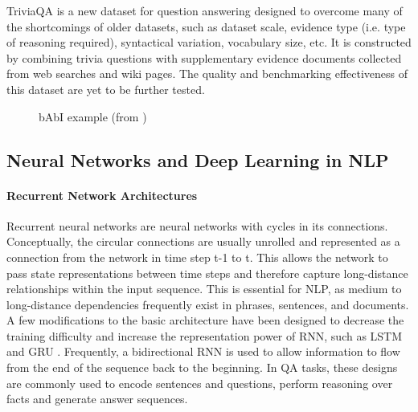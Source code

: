 \documentclass[]{article}
\begin{document}
TriviaQA \cite{joshi2017triviaqa} is a new dataset for question answering designed to overcome many of the shortcomings of older datasets, such as dataset scale, evidence type (i.e. type of reasoning required), syntactical variation, vocabulary size, etc. It is constructed by combining trivia questions with supplementary evidence documents collected from web searches and wiki pages. The quality and benchmarking effectiveness of this dataset are yet to be further tested. 

\begin{center}
\begin{figure}
\caption{bAbI example (from \cite{hermann2015teaching})}
\label{fig:babi}
\end{figure}
\end{center}

\subsection{Neural Networks and Deep Learning in NLP}

\paragraph{Recurrent Network Architectures}
Recurrent neural networks are neural networks with cycles in its connections. Conceptually, the circular connections are usually unrolled and represented as a connection from the network in time step t-1 to t. This allows the network to pass state representations between time steps and therefore capture long-distance relationships within the input sequence. This is essential for NLP, as medium to long-distance dependencies frequently exist in phrases, sentences, and documents. A few modifications to the basic architecture have been designed to decrease the training difficulty and increase the representation power of RNN, such as LSTM \cite{hochreiter1997long} and GRU \cite{cho2014learning}. Frequently, a bidirectional RNN is used to allow information to flow from the end of the sequence back to the beginning. In QA tasks, these designs are commonly used to encode sentences and questions, perform reasoning over facts and generate answer sequences. 
\end{document}
